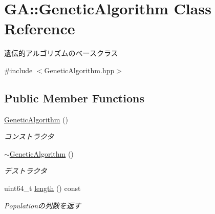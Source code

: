\hypertarget{class_g_a_1_1_genetic_algorithm}{}\section{GA\+::Genetic\+Algorithm Class Reference}
\label{class_g_a_1_1_genetic_algorithm}


遺伝的アルゴリズムのベースクラス  




{\ttfamily \#include $<$Genetic\+Algorithm.\+hpp$>$}

\subsection*{Public Member Functions}
\begin{DoxyCompactItemize}
\item 
\mbox{\label{class_g_a_1_1_genetic_algorithm_ab9ea4a383b2872e420d553414f4f86b1}} 
\mbox{\hyperlink{class_g_a_1_1_genetic_algorithm_ab9ea4a383b2872e420d553414f4f86b1}{Genetic\+Algorithm}} ()
\begin{DoxyCompactList}\small\item\em コンストラクタ \end{DoxyCompactList}\item 
\mbox{\label{class_g_a_1_1_genetic_algorithm_a0a82a40c0777aee6dc1d7cedd91f2a46}} 
\mbox{\hyperlink{class_g_a_1_1_genetic_algorithm_a0a82a40c0777aee6dc1d7cedd91f2a46}{$\sim$\+Genetic\+Algorithm}} ()
\begin{DoxyCompactList}\small\item\em デストラクタ \end{DoxyCompactList}\item 
\mbox{\label{class_g_a_1_1_genetic_algorithm_ac14b87eff3d1c6efc8df49ea553f1899}} 
uint64\+\_\+t \mbox{\hyperlink{class_g_a_1_1_genetic_algorithm_ac14b87eff3d1c6efc8df49ea553f1899}{length}} () const
\begin{DoxyCompactList}\small\item\em Populationの列数を返す \end{DoxyCompactList}\item 
\mbox{\label{class_g_a_1_1_genetic_algorithm_a2661a7b2739663668602af7648d1e0d3}} 

\end{DoxyCompactItemize}
